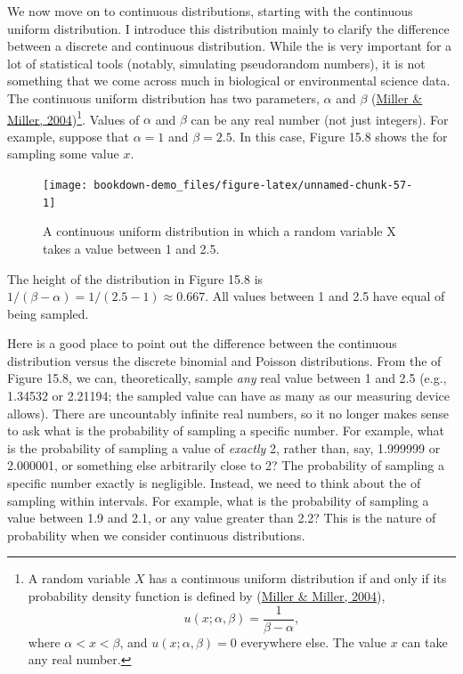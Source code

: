 \documentclass[
  openany]{krantz}
\begin{document}
We now move on to continuous distributions, starting with the continuous uniform distribution.
I introduce this distribution mainly to clarify the difference between a discrete and continuous distribution.
While the  is very important for a lot of statistical tools (notably, simulating pseudorandom numbers), it is not something that we come across much in biological or environmental science data.
The continuous uniform distribution has two parameters, \(\alpha\) and \(\beta\) (\protect\hyperlink{ref-Miller2004}{Miller \& Miller, 2004})\({ }\)\footnote{A random variable \(X\) has a continuous uniform distribution if and only if its probability density function is defined by (\protect\hyperlink{ref-Miller2004}{Miller \& Miller, 2004}), \[u\left(x; \alpha, \beta\right) = \frac{1}{\beta - \alpha},\] where \(\alpha < x < \beta\), and \(u\left(x; \alpha, \beta\right) = 0\) everywhere else. The value \(x\) can take any real number.}.
Values of \(\alpha\) and \(\beta\) can be any real number (not just integers).
For example, suppose that \(\alpha = 1\) and \(\beta = 2.5\).
In this case, Figure 15.8 shows the  for sampling some value \(x\).

\begin{figure}
\texttt{[image: bookdown-demo\_files/figure-latex/unnamed-chunk-57-1]} \caption{A continuous uniform distribution in which a random variable X takes a value between 1 and 2.5.}\label{fig:unnamed-chunk-57}
\end{figure}

The height of the distribution in Figure 15.8 is \(1/(\beta - \alpha) = 1/(2.5 - 1) \approx 0.667\).
All values between 1 and 2.5 have equal  of being sampled.

Here is a good place to point out the difference between the continuous distribution versus the discrete binomial and Poisson distributions.
From the  of Figure 15.8, we can, theoretically, sample \emph{any} real value between 1 and 2.5 (e.g., 1.34532 or 2.21194; the sampled value can have as many  as our measuring device allows).
There are uncountably infinite real numbers, so it no longer makes sense to ask what is the probability of sampling a specific number.
For example, what is the probability of sampling a value of \emph{exactly} 2, rather than, say, 1.999999 or 2.000001, or something else arbitrarily close to 2?
The probability of sampling a specific number exactly is negligible.
Instead, we need to think about the  of sampling within intervals.
For example, what is the probability of sampling a value between 1.9 and 2.1, or any value greater than 2.2?
This is the nature of probability when we consider continuous distributions.
\end{document}
